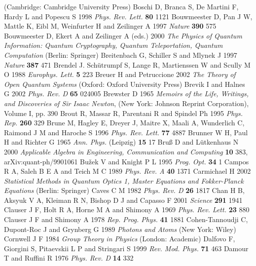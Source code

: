 \documentclass[12pt,amsmath,amssymb]{article}
\numberwithin{equation}{section}
\begin{document}
\begin{thebibliography}{999}
(Cambridge: Cambridge University Press)
Boschi D, Branca S, De Martini F, Hardy L and Popescu S 1998
{\it Phys. Rev. Lett.} {\bf 80} 1121
Bouwmeester D, Pan J W, Mattle K, Eibl M, Weinfurter H and
Zeilinger A 1997
{\it Nature} {\bf 390} 575
Bouwmeester D, Ekert A and Zeilinger A (eds.) 2000
{\it The Physics of Quantum Information: Quantum Cryptography,
Quantum Teleportation, Quantum Computation}
(Berlin: Springer)
Breitenbach G, Schiller S and Mlynek J 1997
{\it Nature} {\bf 387} 471
Brendel J. Sch\"utrumpf S, Lange R, Martienssen W and Scully M O 1988
{\it Europhys. Lett.} {\bf 5} 223
Breuer H and Petruccione 2002
{\it The Theory of Open Quantum Systems}
(Oxford: Oxford University Press)
Brevik I and Halnes G 2002
{\it Phys. Rev. D} {\bf 65} 024005
Brewster D 1965
{\it Memoirs of the Life, Writings, and Discoveries
of Sir Isaac Newton},
(New York: Johnson Reprint Corporation),
Volume I, pp. 390
Brout R, Massar R, Parentani R and Spindel Ph 1995
{\it Phys. Rep.} {\bf 260} 329
Brune M, Hagley E, Dreyer J, Maitre X, Maali A, Wunderlich C,
Raimond J M and Haroche S 1996
{\it Phys. Rev. Lett.} {\bf 77} 4887
Brunner W H, Paul H and Richter G 1965 {\it Ann. Phys.} (Leipzig)
{\bf 15} 17
Bru{\ss} D and L\"utkenhaus N 2000 {\it Applicable Algebra in Engineering,
Communication and Computing} {\bf 10} 383, arXiv:quant-ph/9901061
Bu\v{z}ek V and Knight P L 1995
{\it Prog. Opt.} {\bf 34} 1
Campos R A, Saleh B E A and Teich M C 1989
{\it Phys. Rev. A} {\bf 40} 1371
Carmichael H 2002
{\it Statistical Methods in Quantum Optics 1,
Master Equations and Fokker-Planck Equations}
(Berlin: Springer)
Caves C M 1982 {\it Phys. Rev. D} {\bf 26} 1817
Chan H B, Aksyuk V A, Kleiman R N, Bishop D J and Capasso F 2001
{\it Science} {\bf 291} 1941
Clauser J F, Holt R A, Horne M A and Shimony A 1969
{\it Phys. Rev. Lett.} {\bf 23} 880
Clauser J F and Shimony A 1978
{\it Rep. Prog. Phys.} {\bf 41} 1881
Cohen-Tannoudji C, Dupont-Roc J and Grynberg G 1989
{\it Photons and Atoms}
(New York: Wiley)
Cornwell J F 1984
{\it Group Theory in Physics}
(London: Academic)
Dalfovo F, Giorgini S, Pitaevskii L P and Stringari S 1999
{\it Rev. Mod. Phys.} {\bf 71} 463
Damour T and Ruffini R 1976
{\it Phys. Rev. D} {\bf 14} 332

\end{thebibliography}
\end{document}
